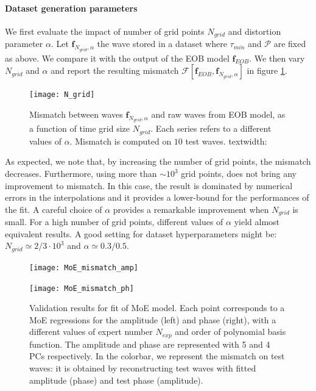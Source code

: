 \paragraph{Dataset generation parameters}
We first evaluate the impact of number of grid points $N_{grid}$ and distortion parameter $\alpha$.
Let $\mathbf{f}_{N_{grid}, \alpha}$ the wave stored in a dataset where $\tau_{min}$ and $\mathcal{P}$ are fixed as above. We compare it with the output of the EOB model $\mathbf{f}_{EOB}$.
We then vary $N_{grid}$ and $\alpha$ and report the resulting mismatch $\mathcal{F}[\mathbf{f}_{EOB}, \mathbf{f}_{N_{grid}, \alpha}]$ in figure \ref{fig:N_grid}.
\begin{figure}[!t]
	\centering
	\texttt{[image: N\_grid]}
	\caption{Mismatch between waves $\mathbf{f}_{N_{grid}, \alpha}$ and raw waves from EOB model, as a function of time grid size $N_{grid}$. Each series refers to a different values of $\alpha$.
Mismatch is computed on $10$ test waves.  textwidth: \prntlen{\linewidth}
}
	\label{fig:N_grid}
\end{figure}
\par
As expected, we note that, by increasing the number of grid points, the mismatch decreases. Furthermore, using more than $\sim 10^3$ grid points, does not bring any improvement to mismatch. In this case, the result is dominated by numerical errors in the interpolations and it provides a lower-bound for the performances of the fit.
A careful choice of $\alpha$ provides a remarkable improvement when $N_{grid}$ is small. For a high number of grid points, different values of $\alpha$ yield almost equivalent results.
A good setting for dataset hyperparameters might be: $N_{grid} \simeq 2/3 \cdot 10^{3}$ and $\alpha \simeq 0.3/0.5$.
\begin{figure}[!t]
	\centering
    \begin{minipage}{.5\linewidth}
        \centering
        \texttt{[image: MoE\_mismatch\_amp]}
    \end{minipage}\hfill
    \begin{minipage}{.5\linewidth}
        \centering
        \texttt{[image: MoE\_mismatch\_ph]}
    \end{minipage}
	\caption{Validation results for fit of MoE model. Each point corresponds to a MoE regressions for the amplitude (left) and phase (right), with a different values of expert number $N_{exp}$ and order of polynomial basis function.
The amplitude and phase are represented with 5 and 4 PCs respectively.
In the colorbar, we represent the mismatch on test waves: it is obtained by reconstructing test waves with fitted amplitude (phase) and test phase (amplitude).
}
	\label{fig:MoE_test}
\end{figure}


